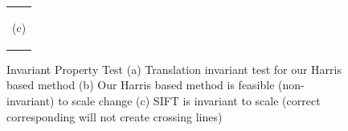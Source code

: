 \documentclass{article}
\begin{document}
\begin{figure}[p]
\begin{center}
\begin{tabular}{@{} c @{}}
\begin{minipage}{1.0\hsize}
\begin{center}
          (c)
        \end{center}
      \end{minipage}    \\
    \end{tabular}
    \caption{
      Invariant Property Test
      (a) Translation invariant test for our Harris based method
      (b) Our Harris based method is feasible (non-invariant) to scale change
      (c) SIFT is invariant to scale (correct corresponding will not create crossing lines)
    }
    \label{Fi:INVARIANT}
  \end{center}
\end{figure} 


\begin{figure}[p]
  \begin{center}
    \begin{tabular}{@{} ccc @{}}


\end{tabular}
\end{center}
\end{figure}
\end{document}
